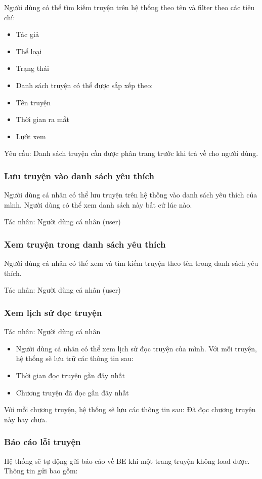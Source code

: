 \documentclass[./../main.tex]{subfiles}
\begin{document}
Người dùng có thể tìm kiếm truyện trên hệ thống theo tên và filter theo các tiêu chí:
\begin{itemize}
\item Tác giả
\item Thể loại
\item Trạng thái
\item Danh sách truyện có thể được sắp xếp theo:
\item Tên truyện
\item Thời gian ra mắt
\item Lướt xem
\end{itemize}
Yêu cầu: Danh sách truyện cần được phân trang trước khi trả về cho người dùng.

\subsubsection{Lưu truyện vào danh sách yêu thích}
Người dùng cá nhân có thể lưu truyện trên hệ thống vào danh sách yêu thích của mình. Người dùng có thể xem danh sách này bất cứ lúc nào.


Tác nhân: Người dùng cá nhân (user)

\subsubsection{Xem truyện trong danh sách yêu thích}
Người dùng cá nhân có thể xem và tìm kiếm truyện theo tên trong danh sách yêu thích.

Tác nhân: Người dùng cá nhân (user)

\subsubsection{Xem lịch sử đọc truyện}
Tác nhân: Người dùng cá nhân
\begin{itemize}
\item Người dùng cá nhân có thể xem lịch sử đọc truyện của mình. Với mỗi truyện, hệ thống sẽ lưu trữ các thông tin sau:
\item Thời gian đọc truyện gần đây nhất
\item Chương truyện đã đọc gần đây nhất
\end{itemize}
Với mỗi chương truyện, hệ thống sẽ lưu các thông tin sau: Đã đọc chương truyện này hay chưa.

\subsubsection{Báo cáo lỗi truyện}
Hệ thống sẽ tự động gửi báo cáo về BE khi một trang truyện không load được. Thông tin gửi bao gồm:
\end{document}
